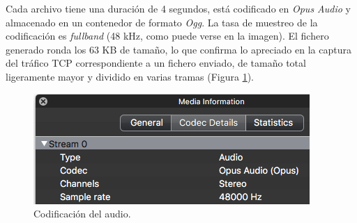 Cada archivo tiene una duración de 4 segundos, está codificado en \emph{Opus Audio} \cite{OpusCodec} y almacenado en un contenedor de formato \emph{Ogg}. La tasa de muestreo de la codificación es \emph{fullband} (48 kHz, como puede verse en la imagen). El fichero generado ronda los 63 KB de tamaño, lo que confirma lo apreciado en la captura del tráfico TCP correspondiente a un fichero enviado, de tamaño total ligeramente mayor y dividido en varias tramas (Figura \ref{audioInfo}).

\begin{figure}[!t]
\begin{center}
\includegraphics[width=0.75\linewidth]{./6_EvalEmpirica/Img/audioInfo.png}
\end{center}
\caption{Codificación del audio.}
\label{audioInfo}
\end{figure}
